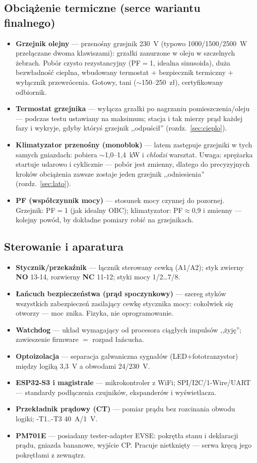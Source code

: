 \documentclass[11pt,a4paper]{article}
\newcommand{\poj}[2]{\item \textbf{#1} --- #2}
\begin{document}
\subsection{Obciążenie termiczne (serce wariantu finalnego)}
\begin{itemize}
\poj{Grzejnik olejny}{przenośny grzejnik 230~V (typowo 1000/1500/2500~W przełączane dwoma
klawiszami): grzałki zanurzone w oleju w szczelnych żebrach. Pobór czysto rezystancyjny
(PF$=$1, idealna sinusoida), duża bezwładność cieplna, wbudowany termostat $+$ bezpiecznik
termiczny $+$ wyłącznik przewrócenia. Gotowy, tani ($\sim$150--250~zł), certyfikowany odbiornik.}
\poj{Termostat grzejnika}{wyłącza grzałki po nagrzaniu pomieszczenia/oleju --- podczas testu
ustawiany na maksimum; stacja i tak mierzy prąd każdej fazy i wykryje, gdyby któryś grzejnik
,,odpuścił'' (rozdz.~\ref{sec:cieplo}).}
\poj{Klimatyzator przenośny (monoblok)}{latem zastępuje grzejniki w tych samych gniazdach:
pobiera $\sim$1,0--1,4~kW i \emph{chłodzi} warsztat. Uwaga: sprężarka startuje udarowo i cyklicznie
--- pobór jest zmienny, dlatego do precyzyjnych kroków obciążenia zawsze zostaje jeden grzejnik
,,odniesienia'' (rozdz.~\ref{sec:lato}).}
\poj{PF (współczynnik mocy)}{stosunek mocy czynnej do pozornej. Grzejnik: PF$=$1 (jak idealny OBC);
klimatyzator: PF$\approx$0,9 i zmienny --- kolejny powód, by dokładne pomiary robić na grzejnikach.}
\end{itemize}
\subsection{Sterowanie i aparatura}
\begin{itemize}
\poj{Stycznik/przekaźnik}{łącznik sterowany cewką (A1/A2); styk zwierny \textbf{NO} 13-14,
rozwierny \textbf{NC} 11-12; styki mocy 1/2\ldots7/8.}
\poj{Łańcuch bezpieczeństwa (prąd spoczynkowy)}{szereg styków wszystkich zabezpieczeń zasilający
cewkę stycznika mocy: cokolwiek się otworzy --- moc znika. Fizyka, nie oprogramowanie.}
\poj{Watchdog}{układ wymagający od procesora ciągłych impulsów ,,żyję''; zawieszenie firmware
$=$ rozpad łańcucha.}
\poj{Optoizolacja}{separacja galwaniczna sygnałów (LED$+$fototranzystor) między logiką 3,3~V
a obwodami 24/230~V.}
\poj{ESP32-S3 i magistrale}{mikrokontroler z WiFi; SPI/I2C/1-Wire/UART --- standardy podłączenia
czujników, ekspanderów i wyświetlacza.}
\poj{Przekładnik prądowy (CT)}{pomiar prądu bez rozcinania obwodu logiki; -T1..-T3 40~A/1~V.}
\poj{PM701E}{posiadany tester-adapter EVSE: pokrętła stanu i deklaracji prądu, gniazda bananowe,
wyjście CP. Pracuje nietknięty --- serwa kręcą jego pokrętłami z zewnątrz.}
\end{itemize}
\end{document}

